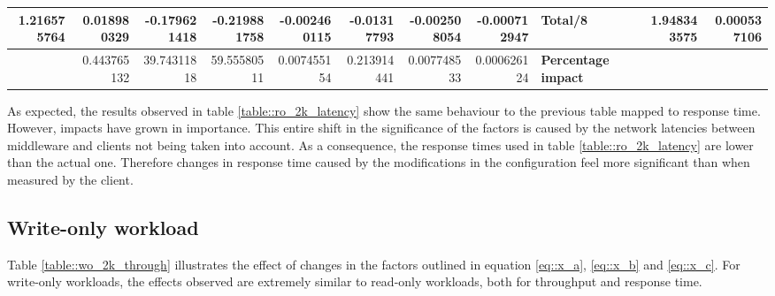 \documentclass[11pt,a4paper]{article}
\begin{document}
{\begin{landscape}
{\begin{tabular}{|*{15}{r|}}
                \hline 1.216575764 & 0.018980329 & -0.179621418 & -0.219881758 & -0.002460115 & -0.01317793 & -0.002508054 & -0.000712947 & \multicolumn{3}{|l|}{\textbf{Total/8}} & \multicolumn{2}{|r|}{} & 1.948343575 & 0.000537106 \\
                \hline & 0.443765132 & 39.74311818 & 59.55580511 & 0.007455154 & 0.213914441 & 0.007748533 & 0.000626124 & \multicolumn{3}{|l|}{\textbf{Percentage impact}} & \multicolumn{4}{|l|}{} \\
                \hline
            \end{tabular}
        }
        \label{table::ro_2k_latency}

    \end{landscape}
    \clearpage%
}

As expected, the results observed in table \ref{table::ro_2k_latency} show the same behaviour to the previous table mapped to response time. However, impacts have grown in importance. This entire shift in the significance of the factors is caused by the network latencies between middleware and clients not being taken into account. As a consequence, the response times used in table \ref{table::ro_2k_latency} are lower than the actual one. Therefore changes in response time caused by the modifications in the configuration feel more significant than when measured by the client.


\subsection{Write-only workload}
Table \ref{table::wo_2k_through} illustrates the effect of changes in the factors outlined in equation \ref{eq::x_a}, \ref{eq::x_b} and \ref{eq::x_c}. For write-only workloads, the effects observed are extremely similar to read-only workloads, both for throughput and response time.
\end{document}
